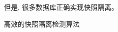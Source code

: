 \begin{frame}{}
  \begin{center}
    但是, 很多数据库正确实现快照隔离。

    \vspace{0.30cm}
  \end{center}
\end{frame}

\begin{frame}{}
  \begin{center}
    高效的快照隔离检测算法

  \end{center}
\end{frame}

\begin{frame}{}
  \begin{center}
  \end{center}
\end{frame}
